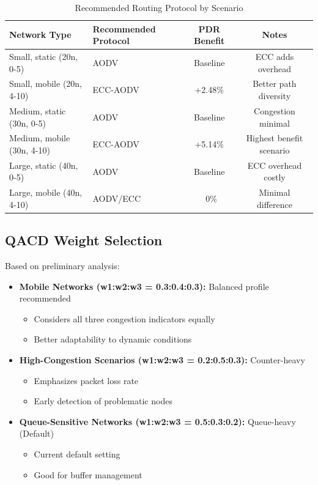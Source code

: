 \documentclass[11pt,a4paper]{article}
\begin{document}
\begin{table}[H]
\centering
\caption{Recommended Routing Protocol by Scenario}
\begin{tabular}{llcc}
\toprule
\textbf{Network Type} & \textbf{Recommended Protocol} & \textbf{PDR Benefit} & \textbf{Notes} \\
\midrule
Small, static (20n, 0-5) & AODV & Baseline & ECC adds overhead \\
Small, mobile (20n, 4-10) & ECC-AODV & +2.48\% & Better path diversity \\
Medium, static (30n, 0-5) & AODV & Baseline & Congestion minimal \\
Medium, mobile (30n, 4-10) & ECC-AODV & +5.14\% & Highest benefit scenario \\
Large, static (40n, 0-5) & AODV & Baseline & ECC overhead costly \\
Large, mobile (40n, 4-10) & AODV/ECC & ~0\% & Minimal difference \\
\bottomrule
\end{tabular}
\end{table}

\subsection{QACD Weight Selection}

Based on preliminary analysis:

\begin{itemize}
    \item \textbf{Mobile Networks (w1:w2:w3 = 0.3:0.4:0.3):} Balanced profile recommended
    \begin{itemize}
        \item Considers all three congestion indicators equally
        \item Better adaptability to dynamic conditions
    \end{itemize}
    
    \item \textbf{High-Congestion Scenarios (w1:w2:w3 = 0.2:0.5:0.3):} Counter-heavy
    \begin{itemize}
        \item Emphasizes packet loss rate
        \item Early detection of problematic nodes
    \end{itemize}
    
    \item \textbf{Queue-Sensitive Networks (w1:w2:w3 = 0.5:0.3:0.2):} Queue-heavy (Default)
    \begin{itemize}
        \item Current default setting
        \item Good for buffer management
    \end{itemize}
\end{itemize}
\end{document}

